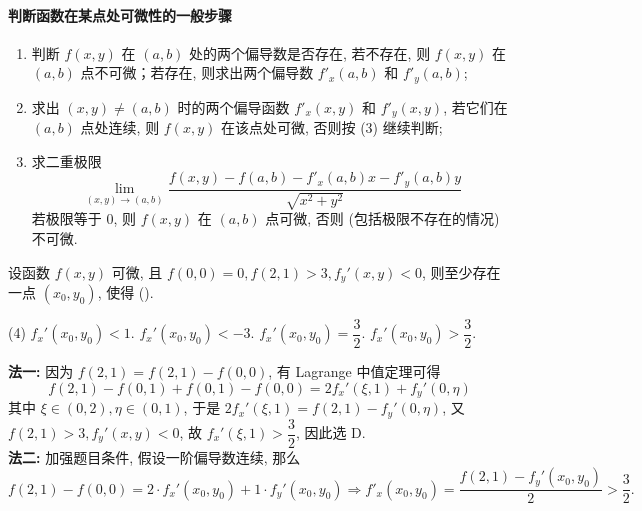 \paragraph{判断函数在某点处可微性的一般步骤}
\begin{enumerate}[label=(\arabic{*})]
    \item 判断 $f(x,y)$ 在 $(a,b)$ 处的两个偏导数是否存在, 若不存在, 则 $f(x,y)$ 在 $(a,b)$ 点不可微；若存在, 则求出两个偏导数 $f'_x(a,b)$ 和 $f'_y(a,b)$;
    \item 求出 $(x,y)\neq (a,b)$ 时的两个偏导函数 $f'_x(x,y)$ 和 $f'_y(x,y)$, 若它们在 $(a,b)$ 点处连续, 则 $f(x,y)$ 在该点处可微, 否则按 (3) 继续判断;
    \item 求二重极限 $$\lim_{(x,y)\to(a,b)}\dfrac{f(x,y)-f(a,b)-f'_x(a,b)x-f'_y(a,b)y}{\sqrt{x^2+y^2}}$$ 若极限等于 0, 则 $f(x,y)$ 在 $(a,b)$ 点可微, 否则 (包括极限不存在的情况) 不可微.
\end{enumerate}

\begin{example}
    设函数 $f(x,y)$ 可微, 且 $f(0,0)=0, f(2,1)>3, f_y'(x,y)<0$, 则至少存在一点 $(x_0,y_0)$, 使得 (\quad).
    \begin{tasks}(4)
        \task $f_x'(x_0,y_0)<1.$
        \task $f_x'(x_0,y_0)<-3.$
        \task $f_x'(x_0,y_0)=\dfrac{3}{2}.$
        \task $f_x'(x_0,y_0)>\dfrac{3}{2}.$
    \end{tasks}
\end{example}
\begin{solution}
    \textbf{法一: }因为 $f(2,1)=f(2,1)-f(0,0)$, 有 Lagrange 中值定理可得 
    $$
    f(2,1)-f(0,1)+f(0,1)-f(0,0)=2f_x'(\xi,1)+f_y'(0, \eta)
    $$
    其中 $\xi\in(0,2),\eta\in(0,1)$, 于是 $2f_x'(\xi,1)=f(2,1)-f_y'(0,\eta)$, 又 $f(2,1)>3, f_y'(x,y)<0$, 故 $f_x'(\xi,1)>\dfrac{3}{2}$, 因此选 D. \\ 
    \textbf{法二: }加强题目条件, 假设一阶偏导数连续, 那么 $$
    f(2,1)-f(0,0)=2\cdot f_x'(x_0,y_0)+1\cdot f_y'(x_0,y_0)\Rightarrow f'_x(x_0,y_0)=\dfrac{f(2,1)-f_y'(x_0,y_0)}{2}>\dfrac{3}{2}.
    $$
\end{solution}

